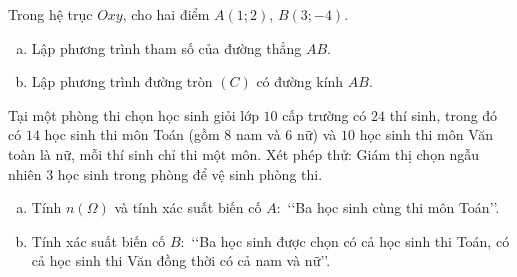 \begin{bt}%
	Trong hệ trục $Oxy$, cho hai điểm $A(1; 2)$, $B(3;-4)$.
	\begin{enumerate}[a)]
		\item Lập phương trình tham số của đường thẳng $AB$.
		\item Lập phương trình đường tròn $(C)$ có đường kính $AB$.
	\end{enumerate}
\end{bt} 

\begin{bt}%
	Tại một phòng thi chọn học sinh giỏi lớp $10$ cấp trường có $24$ thí sinh, trong đó có $14$ học sinh thi môn Toán (gồm $8$ nam và $6$ nữ) và $10$ học sinh thi môn Văn toàn là nữ, mỗi thí sinh chỉ thi một môn. Xét phép thử: Giám thị chọn ngẫu nhiên $3$ học sinh trong phòng để vệ sinh phòng thi.
	\begin{enumerate}[a)]
		\item Tính $n(\Omega)$ và tính xác suất biến cố $A\colon$ \lq\lq Ba học sinh cùng thi môn Toán\rq\rq.
		\item Tính xác suất biến cố $B\colon$ \lq\lq Ba học sinh được chọn có cả học sinh thi Toán, có cả học sinh thi Văn đồng thời có cả nam và nữ\rq\rq.
	\end{enumerate}
\end{bt} 

